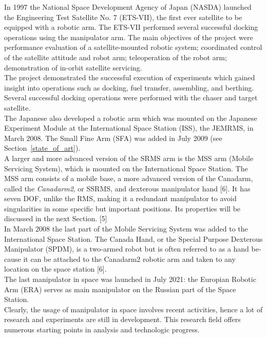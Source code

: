 \documentclass[a4paper,12pt,oneside]{report}
\begin{document}
In 1997 the National Space Development Agency of Japan (NASDA) launched the Engineering Test Satellite No. 7 (ETS-VII), the first ever satellite to be equipped with a robotic arm. The ETS-VII performed several successful docking operations using the manipulator arm. The main objectives of the project were performance evaluation of a satellite-mounted robotic system; coordinated control of the satellite attitude and robot arm; teleoperation of the robot arm; demonstration of in-orbit satellite servicing.\\
The project demonstrated the successful execution of experiments which gained insight into operations such as docking, fuel transfer, assembling, and berthing. Several successful docking operations were performed with the chaser and target satellite.\\
The Japanese also developed a robotic arm which was mounted on the Japanese Experiment Module at the International Space Station (ISS), the JEMRMS, in March 2008. The Small Fine Arm (SFA) was added in July 2009 (see Section~\ref{state_of_art}).\\
A larger and more advanced version of the SRMS arm is the MSS arm (Mobile Servicing System), which is mounted on the International Space Station. The MSS arm consists of a mobile base, a more advanced version of the Canadarm, called the \textit{Canadarm2}, or SSRMS, and dexterous manipulator hand [6]. It has seven DOF, unlike the RMS, making it a redundant manipulator to avoid singularities in some specific but important positions. Its properties will be discussed in the next Section. [5]\\
In March 2008 the last part of the Mobile Servicing System was added to the International Space Station. The Canada Hand, or the Special Purpose Dexterous Manipulator (SPDM), is a two-armed robot but is often referred to as a hand be- cause it can be attached to the Canadarm2 robotic arm and taken to any location on the space station [6].\\
The last manipulator in space was launched in July 2021: the Europian Robotic Arm (ERA) serves as main manipulator on the Russian part of the Space Station.\\
Clearly, the usage of manipulator in space involves recent activities, hence a lot of research and experiments are still in development. This research field offers numerous starting points in analysis and technologic progress.
\end{document}

